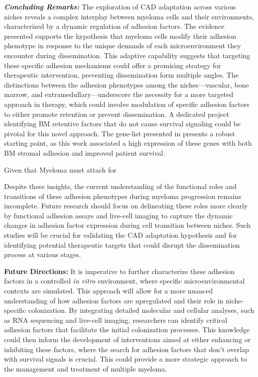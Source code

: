 
\textbf{\textit{Concluding Remarks:}} The exploration of \ac{CAD} adaptation
across various niches reveals a complex interplay between myeloma cells and
their environments, characterized by a dynamic regulation of adhesion factors.
The evidence presented supports the hypothesis that myeloma cells modify their
adhesion phenotype in response to the unique demands of each microenvironment
they encounter during dissemination. This adaptive capability suggests that
targeting these specific adhesion mechanisms could offer a promising strategy
for therapeutic intervention, preventing dissemination form multiple angles. The
distinctions between the adhesion phenotypes among the niches—vascular, bone
marrow, and extramedullary—underscore the necessity for a more targeted approach
in therapy, which could involve modulation of specific adhesion factors to
either promote retention or prevent dissemination. A dedicated project
identifying BM retentive factors that do not cause survival signaling could be
pivotal for this novel approach. The gene-list presented in
 presents a robust starting point, as this work
associated a high expression of these genes with both BM stromal adhesion and
improved patient survival.

Given that Myeloma must attach for

Despite these insights, the current understanding of the functional roles and
transitions of these adhesion phenotypes during myeloma progression remains
incomplete. Future research should focus on delineating these roles more clearly
by functional adhesion assays and live-cell imaging to capture the dynamic
changes in adhesion factor expression during cell transition between niches.
Such studies will be crucial for validating the \ac{CAD} adaptation hypothesis
and for identifying potential therapeutic targets that could disrupt the
dissemination process at various stages.

\textbf{Future Directions:} It is imperative to further characterize these
adhesion factors in a controlled \textit{in vitro} environment, where specific
microenvironmental contexts are simulated. This approach will allow for a more
nuanced understanding of how adhesion factors are upregulated and their role in
niche-specific colonization. By integrating detailed molecular and cellular
analyses, such as RNA sequencing and live-cell imaging, researchers can identify
critical adhesion factors that facilitate the initial colonization processes.
This knowledge could then inform the development of interventions aimed at
either enhancing or inhibiting these factors, where the search for adhesion
factors that don't overlap with survival signals is crucial. This could provide
a more strategic approach to the management and treatment of multiple myeloma.






